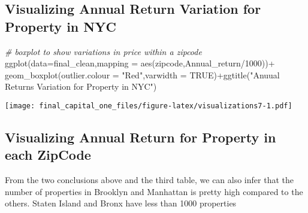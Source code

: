 \documentclass[
]{article}
\newenvironment{Shaded}{\begin{snugshade}}{\end{snugshade}}
\newcommand{\AttributeTok}[1]{\textcolor[rgb]{0.77,0.63,0.00}{#1}}
\newcommand{\CommentTok}[1]{\textcolor[rgb]{0.56,0.35,0.01}{\textit{#1}}}
\newcommand{\ConstantTok}[1]{\textcolor[rgb]{0.00,0.00,0.00}{#1}}
\newcommand{\DecValTok}[1]{\textcolor[rgb]{0.00,0.00,0.81}{#1}}
\newcommand{\FunctionTok}[1]{\textcolor[rgb]{0.00,0.00,0.00}{#1}}
\newcommand{\NormalTok}[1]{#1}
\newcommand{\SpecialCharTok}[1]{\textcolor[rgb]{0.00,0.00,0.00}{#1}}
\newcommand{\StringTok}[1]{\textcolor[rgb]{0.31,0.60,0.02}{#1}}
\begin{document}
\hypertarget{visualizing-annual-return-variation-for-property-in-nyc}{%
\subsection{Visualizing Annual Return Variation for Property in
NYC}\label{visualizing-annual-return-variation-for-property-in-nyc}}

\begin{Shaded}
\begin{Highlighting}[]
\CommentTok{\# boxplot to show variations in price within a zipcode}
\FunctionTok{ggplot}\NormalTok{(}\AttributeTok{data=}\NormalTok{final\_clean,}\AttributeTok{mapping =} \FunctionTok{aes}\NormalTok{(zipcode,Annual\_return}\SpecialCharTok{/}\DecValTok{1000}\NormalTok{))}\SpecialCharTok{+}
\FunctionTok{geom\_boxplot}\NormalTok{(}\AttributeTok{outlier.colour =} \StringTok{"Red"}\NormalTok{,}\AttributeTok{varwidth =} \ConstantTok{TRUE}\NormalTok{)}\SpecialCharTok{+}\FunctionTok{ggtitle}\NormalTok{(}\StringTok{"Anuual Returns  Variation for Property in NYC"}\NormalTok{)}
\end{Highlighting}
\end{Shaded}

\texttt{[image: final\_capital\_one\_files/figure-latex/visualizations7-1.pdf]}

\hypertarget{visualizing-annual-return-for-property-in-each-zipcode}{%
\subsection{Visualizing Annual Return for Property in each
ZipCode}\label{visualizing-annual-return-for-property-in-each-zipcode}}

From the two conclusions above and the third table, we can also infer
that the number of properties in Brooklyn and Manhattan is pretty high
compared to the others. Staten Island and Bronx have less than 1000
properties
\end{document}
